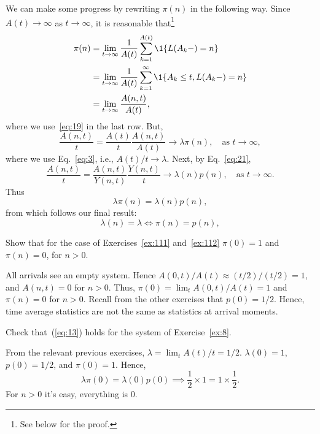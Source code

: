 We can make some progress by rewriting $\pi(n)$ in
the following way. Since $A(t)\to \infty$ as $t\to\infty$, it is reasonable 
that\footnote{See below for the proof.}
\begin{equation}\label{eq:132}
  \begin{split}
  \pi(n) &= \lim_{t\to\infty} \frac1{A(t)}\sum_{k=1}^{A(t)} \1{L(A_k-) = n} \\
  &= \lim_{t\to\infty} \frac1{A(t)}\sum_{k=1}^\infty \1{A_k \leq t, L(A_k-) = n} \\
  &= \lim_{t\to\infty} \frac{A(n,t)}{A(t)},
  \end{split}
\end{equation}
where we use~\eqref{eq:19} in the last row. But, 
\begin{equation}\label{eq:1333}
 \frac{A(n,t)}{t} 
= \frac{A(t)}t \frac{A(n,t)}{A(t)}
\to \lambda  \pi(n), \quad\text{as } t \to \infty, 
\end{equation}
where we use Eq.~\eqref{eq:3}, i.e., $A(t)/t \to \lambda$. 
Next, by  Eq.~\eqref{eq:21}, 
\begin{equation*}
\frac{A(n,t)}t = \frac{A(n,t)}{Y(n,t)}\frac{Y(n,t)}t \to \lambda(n) p(n), \quad\text{as } t \to \infty.
\end{equation*}
Thus
\begin{equation}\label{eq:13}
\lambda  \pi(n) = \lambda(n) p(n), 
\end{equation}
from which  follows our final result:
\begin{equation*}
  \lambda(n) = \lambda \iff \pi(n) = p(n), 
\end{equation*}

\begin{exercise}\label{ex:8} Show that for the case of Exercises~\ref{ex:111} and~\ref{ex:112} $\pi(0)=1$ and $\pi(n)=0$, for $n>0$.

\begin{solution}
  All arrivals see an empty system. Hence $A(0,t)/A(t) \approx (t/2)/(t/2) = 1$, and $A(n,t)=0$ for $n>0$. Thus, $\pi(0) = \lim_t A(0,t)/A(t) = 1$ and $\pi(n)=0$ for $n>0$. Recall from the other exercises that $p(0)=1/2$. Hence, time average statistics are not the same as statistics at arrival moments. 
\end{solution}

\end{exercise}

\begin{exercise}
  Check that~(\ref{eq:13})  holds for the system of Exercise~\ref{ex:8}.
  \begin{solution}
From the relevant previous exercises, $\lambda = \lim_t A(t)/t = 1/2$. $\lambda(0)=1$, $p(0)=1/2$, and $\pi(0)=1$. Hence,
\begin{equation*}
  \lambda \pi(0) = \lambda(0) p(0) \implies  \frac 1 2 \times 1 = 1\times \frac 1 2.
\end{equation*}
For $n>0$ it's easy, everything is 0.
  \end{solution}
\end{exercise}


